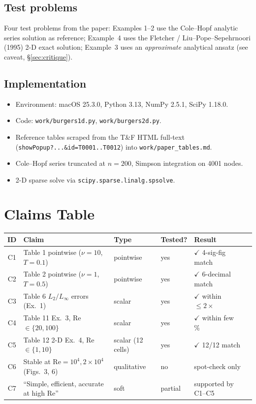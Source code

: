 \documentclass[11pt]{article}
\begin{document}
\subsection{Test problems}
Four test problems from the paper: Examples 1--2 use the Cole--Hopf analytic
series solution as reference; Example~4 uses the Fletcher /
Liu--Pope--Sepehrnoori (1995) 2-D exact solution; Example~3 uses an
\emph{approximate} analytical ansatz (see caveat, \S\ref{sec:critique}).

\subsection{Implementation}
\begin{itemize}
  \item Environment: macOS 25.3.0, Python 3.13, NumPy 2.5.1, SciPy 1.18.0.
  \item Code: \texttt{work/burgers1d.py}, \texttt{work/burgers2d.py}.
  \item Reference tables scraped from the T\&F HTML full-text
        (\texttt{showPopup?...\&id=T0001..T0012}) into \texttt{work/paper\_tables.md}.
  \item Cole--Hopf series truncated at \(n=200\), Simpson integration on 4001 nodes.
  \item 2-D sparse solve via \texttt{scipy.sparse.linalg.spsolve}.
\end{itemize}

\section{Claims Table}
\begin{table}[h]
\centering
\small
\begin{tabular}{clllll}
\toprule
ID & Claim & Type & Tested? & Result \\
\midrule
C1 & Table 1 pointwise (\(\nu{=}10\), \(T{=}0.1\)) & pointwise & yes & \(\checkmark\) 4-sig-fig match \\
C2 & Table 2 pointwise (\(\nu{=}1\), \(T{=}0.5\)) & pointwise & yes & \(\checkmark\) 6-decimal match \\
C3 & Table 6 \(L_2/L_\infty\) errors (Ex.\ 1) & scalar & yes & \(\checkmark\) within \(\le 2\times\) \\
C4 & Table 11 Ex.\ 3, Re\(\in\{20,100\}\) & scalar & yes & \(\checkmark\) within few \% \\
C5 & Table 12 2-D Ex.\ 4, Re\(\in\{1,10\}\) & scalar (12 cells) & yes & \(\checkmark\) 12/12 match \\
C6 & Stable at Re\(=10^4, 2\!\times\!10^4\) (Figs.\ 3, 6) & qualitative & no & spot-check only \\
C7 & ``Simple, efficient, accurate at high Re'' & soft & partial & supported by C1--C5 \\
\bottomrule
\end{tabular}
\end{table}
\end{document}
